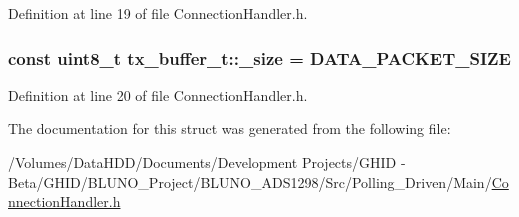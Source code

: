 \-Definition at line 19 of file \-Connection\-Handler.\-h.

\hypertarget{structtx__buffer__t_a9e50e47b9d21ef81014e8325acc2bb3f}{
\subsubsection[{\-\_\-size}]{\setlength{\rightskip}{0pt plus 5cm}const uint8\-\_\-t {\bf tx\-\_\-buffer\-\_\-t\-::\-\_\-size} = {\bf \-D\-A\-T\-A\-\_\-\-P\-A\-C\-K\-E\-T\-\_\-\-S\-I\-Z\-E}}}\label{structtx__buffer__t_a9e50e47b9d21ef81014e8325acc2bb3f}


\-Definition at line 20 of file \-Connection\-Handler.\-h.



\-The documentation for this struct was generated from the following file\-:\begin{DoxyCompactItemize}
\item 
/\-Volumes/\-Data\-H\-D\-D/\-Documents/\-Development Projects/\-G\-H\-I\-D -\/ Beta/\-G\-H\-I\-D/\-B\-L\-U\-N\-O\-\_\-\-Project/\-B\-L\-U\-N\-O\-\_\-\-A\-D\-S1298/\-Src/\-Polling\-\_\-\-Driven/\-Main/\hyperlink{_connection_handler_8h}{\-Connection\-Handler.\-h}\end{DoxyCompactItemize}
